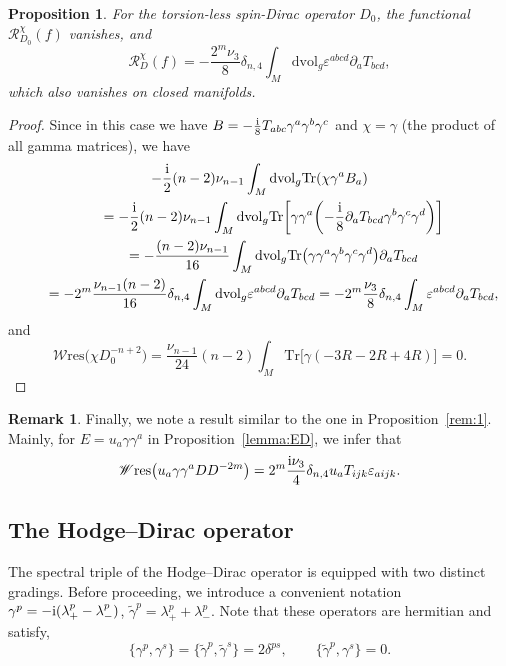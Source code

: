 \documentclass[pdftex]{sigma}
\numberwithin{equation}{section}
\newtheorem{Proposition}[Theorem]{Proposition}
\theoremstyle{definition}
\newtheorem{Remark}[Theorem]{Remark}
\def\W{\mathscr{W} \mathrm{res}}
\def\Tr{\mathrm{Tr}}
\def\dv{\mathrm{dvol}_g}
\begin{document}
\begin{Proposition}
	For the torsion-less spin-Dirac operator $D_0$, the functional $\mathscr{R}_{D_0}^\chi(f)$ vanishes, and
 \[
 \mathscr{R}_{D}^\chi(f)=-\frac{{2^m}\nu_3}{8}\delta_{n,4}\int_M\dv \varepsilon^{abcd}\partial_a T_{bcd},
 \]
 which also vanishes on closed manifolds.
\end{Proposition}
\begin{proof}
Since in this case we have $B=-\frac{\rm i}{8}T_{abc}\gamma^a\gamma^b \gamma^c$ and $\chi=\gamma$ (the product of all gamma matrices), we have
\begin{gather*}
 -\frac{\rm i}{2}(n-2)\nu_{n-1}\int_M\dv \Tr
 (\chi\gamma^a B_a)\\
 \qquad=-\frac{\rm i}{2}(n-2)\nu_{n-1}\int_M\dv \Tr\biggl[\gamma\gamma^a \biggl(-\frac{\rm i}{8}\partial_a T_{bcd} \gamma^b \gamma^c \gamma^d\biggr)\biggr]\\
 \qquad
 =-\frac{(n-2)\nu_{n-1}}{16}\int_M\dv \Tr\bigl(\gamma\gamma^a \gamma^b \gamma^c\gamma^d\bigr)\partial_a T_{bcd}\\
 \qquad=-{2^m}\frac{\nu_{n-1}(n-2)}{16}\delta_{n,4}\int_M \dv \varepsilon^{abcd} \partial_a T_{bcd}
 =-{2^m}\frac{\nu_3}{8}\delta_{n,4}\int_M \varepsilon^{abcd}\partial_a T_{bcd},
\end{gather*}
and
\[
 \W\bigl(\chi D_0^{-n+2}\bigr)=\frac{\nu_{n-1}}{24}(n-2) \int_M \Tr\bigl[\gamma(-3R-2R+4R)\bigr]=0.\tag*{\qed}
\]\renewcommand{\qed}{}
\end{proof}


\begin{Remark}
 Finally, we note a result similar to the one in Proposition~\ref{rem:1}. Mainly, for $E=u_a\gamma\gamma^a$ in Proposition~\ref{lemma:ED}, we infer that
 \[
\W\bigl(u_a\gamma\gamma^aDD^{-2m}\bigr)={2^m}\frac{{\rm i}\nu_{3}}{4}\delta_{n,4}u_a T_{ijk} \varepsilon_{aijk}.
 \]
\end{Remark}

\subsection{The Hodge--Dirac operator}

The spectral triple of the Hodge--Dirac operator is equipped with two distinct gradings. Before proceeding, we introduce a convenient notation
$
 \gamma^p = -{\rm i}(\lambda_+^p -\lambda_-^p)$, $\tilde{\gamma}^p = \lambda^p_+ +\lambda^p_-$.
Note that these operators are hermitian and satisfy,
\[
\{ \gamma^p, \gamma^s \} = \{\tilde{\gamma}^p, \tilde{\gamma}^s \} = 2 \delta^{ps},
\qquad
\{ \tilde{\gamma}^p, \gamma^s \} = 0.
\]
\end{document}
